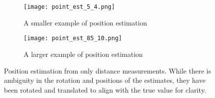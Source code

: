\begin{figure}[ht]
    \centering
    \begin{subfigure}{\linewidth}
        \texttt{[image: point\_est\_5\_4.png]}
        \caption{A smaller example of position estimation}
    \end{subfigure}
    \begin{subfigure}{\linewidth}
        \texttt{[image: point\_est\_85\_10.png]}
        \caption{A larger example of position estimation}
    \end{subfigure}
    \caption{Position estimation from only distance measurements. While there is ambiguity in the rotation and positions of the estimates, they have been rotated and translated to align with the true value for clarity.} \label{fig:riemann}
\end{figure}

